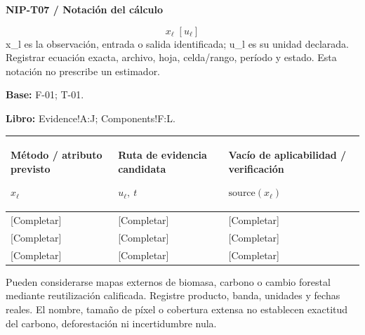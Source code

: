 \par\begingroup\sffamily\fontsize{8}{10}\selectfont\color{NEBGreen}\setlength{\parskip}{2pt}\setlength{\abovedisplayskip}{4pt}\setlength{\belowdisplayskip}{4pt}\setlength{\abovedisplayshortskip}{2pt}\setlength{\belowdisplayshortskip}{3pt}
\textbf{NIP-T07 / Notación del cálculo}\par
{\fontsize{9}{11}\selectfont\[ x_{\ell}\;[u_{\ell}] \]}
x\_l es la observación, entrada o salida identificada; u\_l es su unidad declarada. Registrar ecuación exacta, archivo, hoja, celda/rango, período y estado. Esta notación no prescribe un estimador.\par
\textbf{Base:} F-01; T-01.\par
\textbf{Libro:} Evidence!A:J; Components!F:L.\par\endgroup
{\sffamily\fontsize{8.3}{10.3}\selectfont\begin{longtable}{@{}P{56.09mm} P{49.49mm} P{59.39mm}@{}}
\toprule
\textbf{Método / atributo previsto}\par {\normalfont\fontsize{8.2}{10}\selectfont $x_{\ell}$} & \textbf{Ruta de evidencia candidata}\par {\normalfont\fontsize{8.2}{10}\selectfont $u_{\ell},\ t$} & \textbf{Vacío de aplicabilidad / verificación}\par {\normalfont\fontsize{8.2}{10}\selectfont $\text{source}(x_{\ell})$}\\\midrule\endhead
\rule{0pt}{7.7mm}[Completar] & [Completar] & [Completar]\\\hline
\rule{0pt}{7.7mm}[Completar] & [Completar] & [Completar]\\\hline
\rule{0pt}{7.7mm}[Completar] & [Completar] & [Completar]\\\hline
\end{longtable}}
\begin{Notice}Pueden considerarse mapas externos de biomasa, carbono o cambio forestal mediante reutilización calificada. Registre producto, banda, unidades y fechas reales. El nombre, tamaño de píxel o cobertura extensa no establecen exactitud del carbono, deforestación ni incertidumbre nula.\end{Notice}
